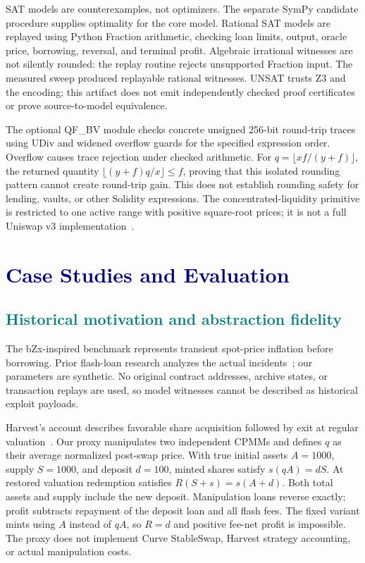 \documentclass[conference]{IEEEtran}
\begin{document}
SAT models are counterexamples, not optimizers. The separate SymPy candidate
procedure supplies optimality for the core model. Rational SAT models are
replayed using Python Fraction arithmetic, checking loan limits, output,
oracle price, borrowing, reversal, and terminal profit. Algebraic irrational
witnesses are not silently rounded: the replay routine rejects unsupported
Fraction input. The measured sweep produced replayable rational witnesses.
UNSAT trusts Z3 and the encoding; this artifact does not emit independently
checked proof certificates or prove source-to-model equivalence.

The optional QF\_BV module checks concrete unsigned 256-bit round-trip traces
using UDiv and widened overflow guards for the specified expression order.
Overflow causes trace rejection under checked arithmetic. For
$q=\lfloor xf/(y+f)\rfloor$, the returned quantity
$\lfloor(y+f)q/x\rfloor\leq f$, proving that this isolated rounding pattern
cannot create round-trip gain. This does not establish rounding safety for
lending, vaults, or other Solidity expressions. The concentrated-liquidity
primitive is restricted to one active range with positive square-root prices;
it is not a full Uniswap v3 implementation~\cite{uniswap}.

\section{\textcolor{Navy}{Case Studies and Evaluation}}
\subsection{\textcolor{Teal}{Historical motivation and abstraction fidelity}}
The bZx-inspired benchmark represents transient spot-price inflation before
borrowing. Prior flash-loan research analyzes the actual incidents~\cite{qin};
our parameters are synthetic. No original contract addresses, archive states,
or transaction replays are used, so model witnesses cannot be described as
historical exploit payloads.

Harvest's account describes favorable share acquisition followed by exit at
regular valuation~\cite{harvest}. Our proxy manipulates two independent CPMMs
and defines $q$ as their average normalized post-swap price. With true initial
assets $A=1000$, supply $S=1000$, and deposit $d=100$, minted shares satisfy
$s(qA)=dS$. At restored valuation redemption satisfies
$R(S+s)=s(A+d)$. Both total assets and supply include the new deposit.
Manipulation loans reverse exactly; profit subtracts repayment of the deposit
loan and all flash fees. The fixed variant mints using $A$ instead of $qA$,
so $R=d$ and positive fee-net profit is impossible. The proxy does not implement
Curve StableSwap, Harvest strategy accounting, or actual manipulation costs.
\end{document}
